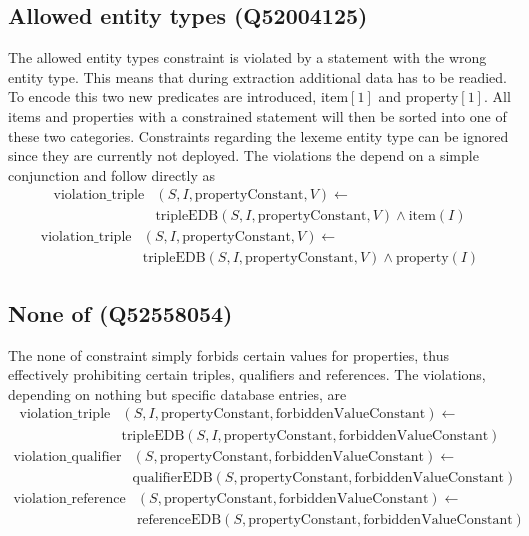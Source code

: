 \documentclass[hyperref,bachelorofscience,fleqn]{cgvpub}
\begin{document}
\subsection{Allowed entity types (Q52004125)}
The allowed entity types constraint is violated by a statement with the wrong entity type. This means that during extraction additional data has to be readied. To encode this two new predicates are introduced, item\([1]\) and property\([1]\). All items and properties with a constrained statement will then be sorted into one of these two categories. Constraints regarding the lexeme entity type can be ignored since they are currently not deployed. The violations the depend on a simple conjunction and follow directly as
\begin{equation*}
\begin{split}
\text{violation\_triple}&(S, I, \text{propertyConstant}, V) \leftarrow \\
&\text{tripleEDB}(S, I, \text{propertyConstant}, V) \wedge \text{item}(I)
\end{split}
\end{equation*}
\begin{equation*}
\begin{split}
\text{violation\_triple}&(S, I, \text{propertyConstant}, V) \leftarrow \\
&\text{tripleEDB}(S, I, \text{propertyConstant}, V) \wedge \text{property}(I)
\end{split}
\end{equation*}

\subsection{None of (Q52558054)}
The none of constraint simply forbids certain values for properties, thus effectively prohibiting certain triples, qualifiers and references. The violations, depending on nothing but specific database entries, are
\begin{equation*}
\begin{split}
\text{violation\_triple}&(S, I, \text{propertyConstant}, \text{forbiddenValueConstant}) \leftarrow \\
&\text{tripleEDB}(S, I, \text{propertyConstant}, \text{forbiddenValueConstant})
\end{split}
\end{equation*}
\begin{equation*}
\begin{split}
\text{violation\_qualifier}&(S, \text{propertyConstant}, \text{forbiddenValueConstant}) \leftarrow \\
&\text{qualifierEDB}(S, \text{propertyConstant}, \text{forbiddenValueConstant})
\end{split}
\end{equation*}
\begin{equation*}
\begin{split}
\text{violation\_reference}&(S, \text{propertyConstant}, \text{forbiddenValueConstant}) \leftarrow \\
&\text{referenceEDB}(S, \text{propertyConstant}, \text{forbiddenValueConstant})
\end{split}
\end{equation*}
\end{document}
